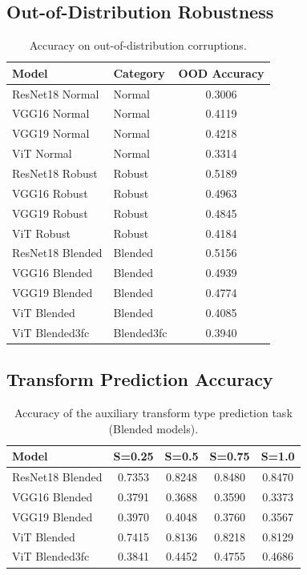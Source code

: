 \documentclass[11pt,a4paper]{article}
\begin{document}
\subsection{Out-of-Distribution Robustness}
\begin{table}[H]
\centering
\caption{Accuracy on out-of-distribution corruptions.}
\label{tab:ood_results}
\begin{tabular}{llc}
\toprule
\textbf{Model} & \textbf{Category} & \textbf{OOD Accuracy} \\
\midrule
ResNet18 Normal & Normal & 0.3006 \\
VGG16 Normal & Normal & 0.4119 \\
VGG19 Normal & Normal & 0.4218 \\
ViT Normal & Normal & 0.3314 \\
ResNet18 Robust & Robust & 0.5189 \\
VGG16 Robust & Robust & 0.4963 \\
VGG19 Robust & Robust & 0.4845 \\
ViT Robust & Robust & 0.4184 \\
ResNet18 Blended & Blended & 0.5156 \\
VGG16 Blended & Blended & 0.4939 \\
VGG19 Blended & Blended & 0.4774 \\
ViT Blended & Blended & 0.4085 \\
ViT Blended3fc & Blended3fc & 0.3940 \\
\bottomrule
\end{tabular}
\end{table}

\subsection{Transform Prediction Accuracy}
\begin{table}[H]
\centering
\caption{Accuracy of the auxiliary transform type prediction task (Blended models).}
\label{tab:transform_pred}
\begin{tabular}{lcccc}
\toprule
\textbf{Model} & \textbf{S=0.25} & \textbf{S=0.5} & \textbf{S=0.75} & \textbf{S=1.0} \\
\midrule
ResNet18 Blended & 0.7353 & 0.8248 & 0.8480 & 0.8470 \\
VGG16 Blended & 0.3791 & 0.3688 & 0.3590 & 0.3373 \\
VGG19 Blended & 0.3970 & 0.4048 & 0.3760 & 0.3567 \\
ViT Blended & 0.7415 & 0.8136 & 0.8218 & 0.8129 \\
ViT Blended3fc & 0.3841 & 0.4452 & 0.4755 & 0.4686 \\
\bottomrule
\end{tabular}
\end{table}
\end{document}
